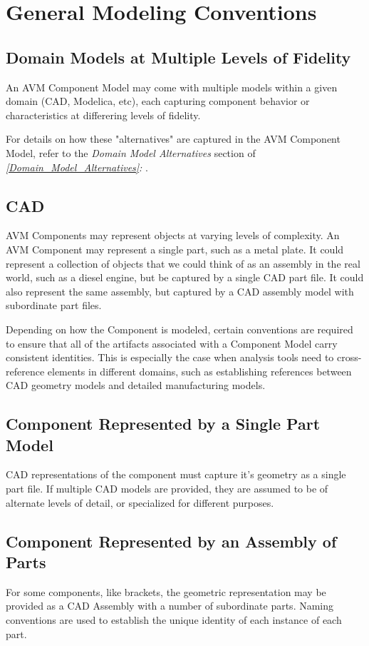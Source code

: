 \section{General Modeling Conventions}
\subsection{Domain Models at Multiple Levels of Fidelity}
An AVM Component Model may come with multiple models within a given domain (CAD, Modelica, etc), each capturing component behavior or characteristics at differering levels of fidelity.

For details on how these "alternatives" are captured in the AVM Component Model, refer to the \textit{Domain Model Alternatives} section of \textit{\autoref{Domain_Model_Alternatives}: }.

\subsection{CAD}
AVM Components may represent objects at varying levels of complexity. An AVM Component may represent a single part, such as a metal plate. It could represent a collection of objects that we could think of as an assembly in the real world, such as a diesel engine, but be captured by a single CAD part file. It could also represent the same assembly, but captured by a CAD assembly model with subordinate part files.

Depending on how the Component is modeled, certain conventions are required to ensure that all of the artifacts associated with a Component Model carry consistent identities. This is especially the case when analysis tools need to cross-reference elements in different domains, such as establishing references between CAD geometry models and detailed manufacturing models.

\subsection{Component Represented by a Single Part Model}
CAD representations of the component must capture it's geometry as a single part file. If multiple CAD models are provided, they are assumed to be of alternate levels of detail, or specialized for different purposes.

\subsection{Component Represented by an Assembly of Parts}
For some components, like brackets, the geometric representation may be provided as a CAD Assembly with a number of subordinate parts. Naming conventions are used to establish the unique identity of each instance of each part.

